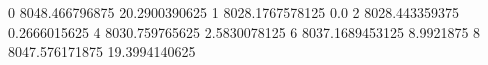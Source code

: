 0 8048.466796875 20.2900390625
1 8028.1767578125 0.0
2 8028.443359375 0.2666015625
4 8030.759765625 2.5830078125
6 8037.1689453125 8.9921875
8 8047.576171875 19.3994140625
